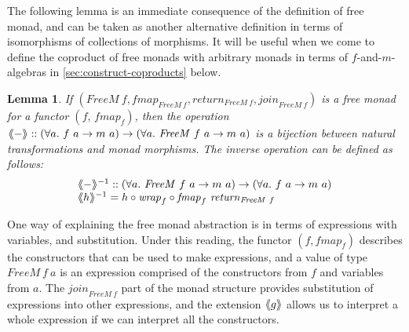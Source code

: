 \documentclass{jfp1}
\newcommand{\fmext}[1]{\langle\kern-0.25em\langle #1 \rangle\kern-0.25em\rangle}
\newtheorem{lemma}{Lemma}
\begin{document}
The following lemma is an immediate consequence of the definition of
free monad, and can be taken as another alternative definition in
terms of isomorphisms of collections of morphisms. It will be useful
when we come to define the coproduct of free monads with arbitrary
monads in terms of $f$-and-$m$-algebras in
\autoref{sec:construct-coproducts} below.

\begin{lemma}
  If $(\mathit{FreeM}~f, \mathit{fmap}_{\mathit{FreeM}~f},
  \mathit{return}_{\mathit{FreeM}~f},
  \mathit{join}_{\mathit{FreeM}~f})$ is a free monad for a functor
  $(f, \,\mathit{fmap}_f)$, then the operation $\fmext{-} :: (\forall
  a.~f~a \to m~a) \to (\forall a.~\mathit{FreeM}~f~a \to m~a)$ is a
  bijection between natural transformations and monad morphisms. The
  inverse operation can be defined as follows:
  \begin{displaymath}
    \begin{array}{l}
      \fmext{-}^{-1} :: (\forall a.~\mathit{FreeM}~f~a \to m~a) \to (\forall a.~f~a \to m~a) \\
      \fmext{h}^{-1} = h \circ \mathit{wrap}_f \circ \mathit{fmap}_f~\mathit{return}_{\mathit{FreeM}~f}
    \end{array}
  \end{displaymath}
\end{lemma}

One way of explaining the free monad abstraction is in terms of
expressions with variables, and substitution. Under this reading, the
functor $(f,\mathit{fmap}_f)$ describes the constructors that can be
used to make expressions, and a value of type $\mathit{FreeM}~f~a$ is
an expression comprised of the constructors from $f$ and variables
from $a$. The $\mathit{join}_{\mathit{FreeM}~f}$ part of the monad
structure provides substitution of expressions into other expressions,
and the extension $\fmext{g}$ allows us to interpret a whole
expression if we can interpret all the constructors.
\end{document}
